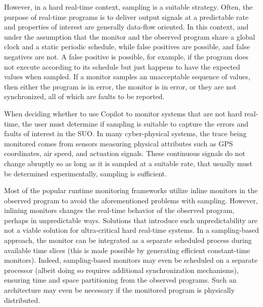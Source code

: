 However, in a hard real-time context, sampling is a suitable strategy.
%
 Often, the purpose of real-time programs is to deliver output signals at a
predictable rate and properties of interest are generally data-flow oriented.
%
 In this context, and under the assumption that the monitor and the observed
program share a global clock and a static periodic schedule, while false
positives are possible, and false negatives are not.
%
 A false positive is possible, for example, if the program does not execute
according to its schedule but just happens to have the expected values when
sampled. 
%
 If a monitor samples an unacceptable sequence of values, then either the
program is in error, the monitor is in error, or they are not synchronized, all
of which are faults to be reported.
%

When deciding whether to use Copilot to monitor systems that are not hard
real-time, the user must determine if sampling is suitable to capture the
errors and faults of interest in the  SUO. In many cyber-physical systems, the
trace being monitored comes from sensors measuring physical attributes such as
GPS coordinates, air speed, and actuation signals.
%
 These continuous signals do not change abruptly so as long as it is sampled at
a suitable rate, that usually must be determined experimentally, sampling is
sufficient.
%

Most of the popular runtime monitoring frameworks utilize inline monitors in the
observed program to avoid the aforementioned problems with sampling.
%
 However, inlining monitors changes the real-time behavior of the observed
program, perhaps in unpredictable  ways.
%
Solutions that introduce such unpredictability are not a viable solution for
ultra-critical hard real-time systems.
%
 In a sampling-based approach, the monitor can be integrated as a separate
scheduled process during available time slices (this is made possible by
generating efficient constant-time monitors).
%
 Indeed, sampling-based monitors may even be scheduled on a separate processor
(albeit doing so requires additional synchronization mechanisms), ensuring time
and space partitioning from the observed programs.
%
 Such an architecture may even be necessary if the monitored program is
physically distributed.




